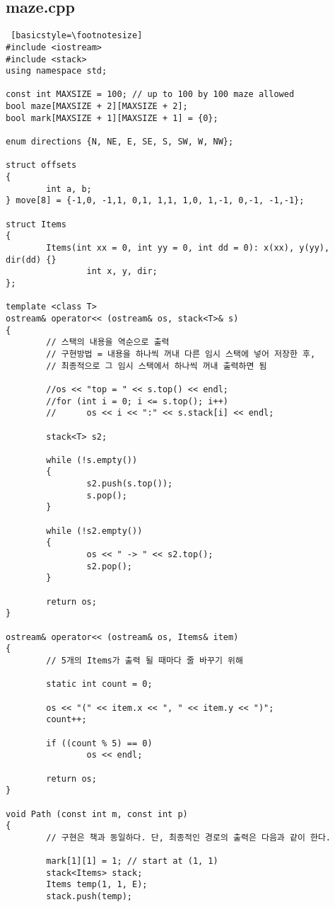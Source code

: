 \documentclass[twoside,twocolumn]{article}
\begin{document}
\subsection{maze.cpp}
\begin{lstlisting} [basicstyle=\footnotesize]
#include <iostream>
#include <stack>
using namespace std;

const int MAXSIZE = 100; // up to 100 by 100 maze allowed
bool maze[MAXSIZE + 2][MAXSIZE + 2];
bool mark[MAXSIZE + 1][MAXSIZE + 1] = {0};

enum directions {N, NE, E, SE, S, SW, W, NW};

struct offsets
{
        int a, b;
} move[8] = {-1,0, -1,1, 0,1, 1,1, 1,0, 1,-1, 0,-1, -1,-1};

struct Items
{
        Items(int xx = 0, int yy = 0, int dd = 0): x(xx), y(yy), dir(dd) {}
                int x, y, dir;
};

template <class T>
ostream& operator<< (ostream& os, stack<T>& s)
{
        // 스택의 내용을 역순으로 출력
        // 구현방법 = 내용을 하나씩 꺼내 다른 임시 스택에 넣어 저장한 후,
        // 최종적으로 그 임시 스택에서 하나씩 꺼내 출력하면 됨

        //os << "top = " << s.top() << endl;
        //for (int i = 0; i <= s.top(); i++)
        //      os << i << ":" << s.stack[i] << endl;

        stack<T> s2;

        while (!s.empty())
        {
                s2.push(s.top());
                s.pop();
        }

        while (!s2.empty())
        {
                os << " -> " << s2.top();
                s2.pop();
        }

        return os;
}

ostream& operator<< (ostream& os, Items& item)
{
        // 5개의 Items가 출력 될 때마다 줄 바꾸기 위해

        static int count = 0;

        os << "(" << item.x << ", " << item.y << ")";
        count++;

        if ((count % 5) == 0)
                os << endl;

        return os;
}

void Path (const int m, const int p)
{
        // 구현은 책과 동일하다. 단, 최종적인 경로의 출력은 다음과 같이 한다.

        mark[1][1] = 1; // start at (1, 1)
        stack<Items> stack;
        Items temp(1, 1, E);
        stack.push(temp);


\end{lstlisting}
\end{document}
